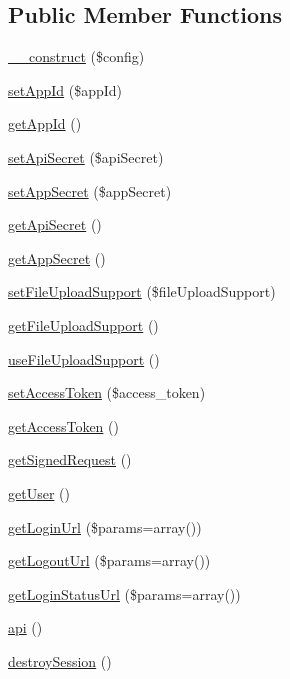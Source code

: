 \subsection*{Public Member Functions}
\begin{DoxyCompactItemize}
\item 
\hyperlink{class_base_facebook_af8ca4863484827e521f5052f5dfed642}{\-\_\-\-\_\-construct} (\$config)
\item 
\hyperlink{class_base_facebook_a4691675e86f0fdba08118a0a50d16999}{set\-App\-Id} (\$app\-Id)
\item 
\hyperlink{class_base_facebook_a1a3ad028a497dede716cb101f779a15c}{get\-App\-Id} ()
\item 
\hyperlink{class_base_facebook_afafa43cb0a481b084ae523a04e816016}{set\-Api\-Secret} (\$api\-Secret)
\item 
\hyperlink{class_base_facebook_ac25a51d73a78e3d3308523fc03c93a05}{set\-App\-Secret} (\$app\-Secret)
\item 
\hyperlink{class_base_facebook_ab97bde45113f0c14d1c42c154e39ecf5}{get\-Api\-Secret} ()
\item 
\hyperlink{class_base_facebook_ae53e6a3cfd3b6ca1dba5c1f5568720ec}{get\-App\-Secret} ()
\item 
\hyperlink{class_base_facebook_a9cd44296e92bd602f54c26d613decefc}{set\-File\-Upload\-Support} (\$file\-Upload\-Support)
\item 
\hyperlink{class_base_facebook_a339321887bccd3b1ebc79c433ed97409}{get\-File\-Upload\-Support} ()
\item 
\hyperlink{class_base_facebook_a21f5271bcb490f3c415923ce956d61ad}{use\-File\-Upload\-Support} ()
\item 
\hyperlink{class_base_facebook_a3844fd3db938af8c4d37ed1edeea3ed5}{set\-Access\-Token} (\$access\-\_\-token)
\item 
\hyperlink{class_base_facebook_a1cdac89b20b87c2c2a20137e5e7a8f17}{get\-Access\-Token} ()
\item 
\hyperlink{class_base_facebook_adf3c753e09842db169309daf8713d17a}{get\-Signed\-Request} ()
\item 
\hyperlink{class_base_facebook_a8a3ed9483d09400ec486232401189cba}{get\-User} ()
\item 
\hyperlink{class_base_facebook_ad8f74c26c7a9bcb82dfe3a411419b553}{get\-Login\-Url} (\$params=array())
\item 
\hyperlink{class_base_facebook_a8083255cc3de8af470925baebccffae2}{get\-Logout\-Url} (\$params=array())
\item 
\hyperlink{class_base_facebook_a3ac3ec2796290a2e3e4d511bbe76abee}{get\-Login\-Status\-Url} (\$params=array())
\item 
\hyperlink{class_base_facebook_a22d6a4c1b6dec331c3bc3f7af02849f5}{api} ()
\item 
\hyperlink{class_base_facebook_a4235356d20fcc14a74c1073b59948b65}{destroy\-Session} ()
\end{DoxyCompactItemize}
